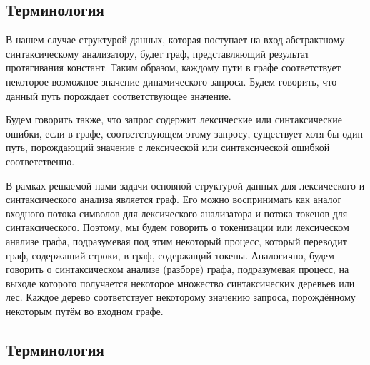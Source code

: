 \documentclass[a5paper]{article}
\begin{document}
\subsection{Терминология}

В нашем случае структурой данных,  которая поступает на вход абстрактному синтаксическому анализатору, будет граф, представляющий результат протягивания констант. Таким образом, каждому пути в графе соответствует некоторое возможное значение динамического запроса. Будем говорить, что данный путь порождает соответствующее значение.

Будем говорить также, что запрос содержит лексические или синтаксические ошибки, если в графе, соответствующем этому запросу, существует хотя бы один путь, порождающий значение с лексической или синтаксической ошибкой соответственно.

В рамках решаемой нами задачи основной структурой данных для лексического и синтаксического анализа является граф. Его можно воспринимать как аналог входного потока символов для лексического анализатора и потока токенов для синтаксического. Поэтому, мы будем говорить о токенизации или лексическом анализе графа, подразумевая под этим некоторый процесс, который переводит граф, содержащий строки, в граф, содержащий токены. Аналогично, будем говорить о синтаксическом анализе (разборе) графа, подразумевая процесс, на выходе которого получается некоторое множество синтаксических деревьев или лес. Каждое дерево соответствует некоторому значению запроса, порождённому некоторым путём во входном графе.

\subsection{Терминология}
\end{document}
